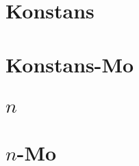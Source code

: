 \begin{spacing}{1.2}
         \section*{Konstans} \label{nthroot1}
         \Fa{
            
         }
         \newpage
         \section*{Konstans-Mo} \label{nthroot1Mo}
         \Mo{
            
         }
         \newpage
         \section*{$n$} \label{nthroot2}
         \Fa{
            
         }
         \newpage
         \section*{$n$-Mo} \label{nthroot2Mo}
         \Mo{
            
         }
         \newpage

\end{spacing}


